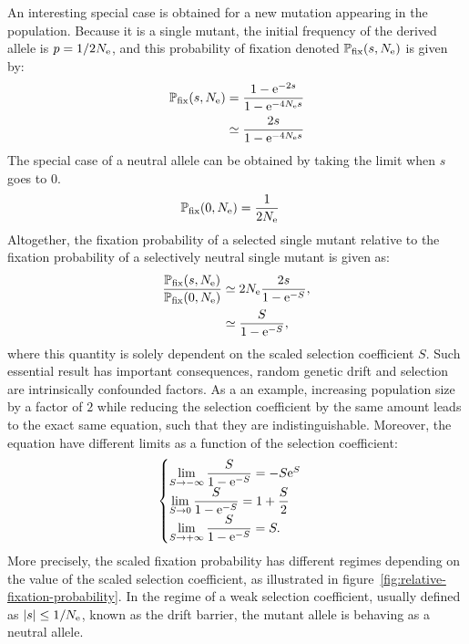 An interesting special case is obtained for a new mutation appearing in the population.
Because it is a single mutant, the initial frequency of the derived allele is $p = 1 / 2 N_{\text{e}}$, and this probability of fixation denoted $\mathbb{P}_{\text{fix}}(s, N_{\text{e}})$ is given by:
\begin{align}
   \mathbb{P}_{\text{fix}}(s, N_{\text{e}}) & = \dfrac{1 - \text{e}^{-2 s}}{1 - \text{e}^{-4 N_{\text{e}} s}} \\
  				 & \simeq  \dfrac{2 s }{1 - \text{e}^{-4 N_{\text{e}} s}}
\end{align}
The special case of a neutral allele can be obtained by taking the limit when $s$ goes to $0$.
\begin{align}
    \mathbb{P}_{\text{fix}}(0, N_{\text{e}}) & = \dfrac{1}{2 N_{\text{e}}}
\end{align}
Altogether, the fixation probability of a selected single mutant relative to the fixation probability of a selectively neutral single mutant is given as:
\begin{align}
    \dfrac{\mathbb{P}_{\text{fix}}(s, N_{\text{e}})}{\mathbb{P}_{\text{fix}}(0, N_{\text{e}})} & \simeq 2 N_{\text{e}} \dfrac{2s}{1 - \text{e}^{-S}}, \\
    & \simeq  \dfrac{S}{1 - \text{e}^{-S}}, \label{eq:p-fix}
\end{align}
where this quantity is solely dependent on the scaled selection coefficient $S$.
Such essential result has important consequences, random genetic drift and selection are intrinsically confounded factors.
As a an example, increasing population size by a factor of $2$ while reducing the selection coefficient by the same amount leads to the exact same equation, such that they are indistinguishable.
Moreover, the equation have different limits as a function of the selection coefficient:
\begin{gather}
    \begin{cases}
        \lim\limits_{S \to -\infty} \dfrac{S}{1 - \text{e}^{-S}} = -S\text{e}^{S} \\
        \lim\limits_{S \to 0} \dfrac{S}{1 - \text{e}^{-S}} = 1 + \dfrac{S}{2}\\
        \lim\limits_{S \to + \infty} \dfrac{S}{1 - \text{e}^{-S}} = S.
    \end{cases} \label{eq:limits-proba-fix}
\end{gather}
More precisely, the scaled fixation probability has different regimes depending on the value of the scaled selection coefficient, as illustrated in figure~\ref{fig:relative-fixation-probability}.
In the regime of a weak selection coefficient, usually defined as $|s| \leq 1 / N_{\text{e}}$, known as the drift barrier, the mutant allele is behaving as a neutral allele.

